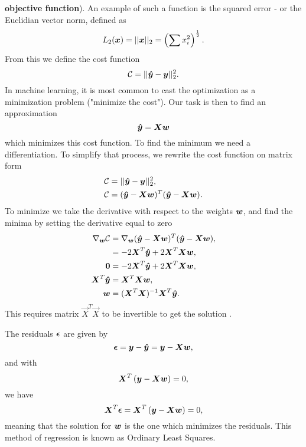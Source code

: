 \textbf{objective function}). An example of such a function is the squared error - or the Euclidian vector norm, defined as
\begin{equation}
	L_2({\boldsymbol{x}}) =||{\boldsymbol{x}}||_2 = \left(\sum x_i^2\right)^{\frac{1}{2}}.
\end{equation}
From this we define the cost function
\begin{equation}
	\mathcal{C} = || {\boldsymbol{\hat{y}}} - {\boldsymbol{y}} ||_2 ^2. \label{eq:cost-mse}
\end{equation}
In machine learning, it is most common to cast the optimization as a minimization problem
("minimize the cost"). Our task is then to find an approximation
\begin{equation}\label{eq:ols-approximation}
	{\boldsymbol{\hat{y}}} = {\boldsymbol{Xw}}
\end{equation}
which minimizes this cost function.
To find the minimum we need a differentiation. To simplify that process, we rewrite the cost function on matrix form
\begin{align*}
\mathcal{C} &= || {\boldsymbol{\hat{y}}} - {\boldsymbol{y}} ||_2 ^2, \\
\mathcal{C} &= ( {\boldsymbol{\hat{y}}} - {\boldsymbol{Xw}})^T( {\boldsymbol{\hat{y}}} - {\boldsymbol{Xw}}).
\end{align*}
To minimize we take the derivative with respect to the weights ${\boldsymbol{w}}$,
and find the minima by setting the derivative equal to zero
\begin{align}
\nabla _{{\boldsymbol{w}}}\mathcal{C} &= \nabla _{{\boldsymbol{w}}} ( {\boldsymbol{\hat{y}}} - {\boldsymbol{Xw}})^T( {\boldsymbol{\hat{y}}} - {\boldsymbol{Xw}}), \\
&= -2{\boldsymbol{X}}^T{\boldsymbol{\hat{y}}} + 2{\boldsymbol{X}}^T{\boldsymbol{X}}{\boldsymbol{w}}, \\
{\boldsymbol{0}} &= -2{\boldsymbol{X}}^T{\boldsymbol{\hat{y}}} + 2{\boldsymbol{X}}^T{\boldsymbol{X}}{\boldsymbol{w}}, \\
{\boldsymbol{X}}^T{\boldsymbol{\hat{y}}} &= {\boldsymbol{X}}^T{\boldsymbol{X}}{\boldsymbol{w}}, \\
{\boldsymbol{w}} &=({\boldsymbol{X}}^T{\boldsymbol{X}})^{-1} {\boldsymbol{X}}^T{\boldsymbol{\hat{y}}}. \label{eq:ols}
\end{align}
This requires matrix \(\vec{X}^T\vec{X}\) to be invertible to get the solution 
\cite{James2000}.

The residuals ${\boldsymbol{\epsilon}}$ are given by
$${\boldsymbol{\epsilon}} = {\boldsymbol{y}}-{\boldsymbol{\hat{y}}} = {\boldsymbol{y}}-{\boldsymbol{X}}{\boldsymbol{w}},$$
and with 
$${\boldsymbol{X}}^T\left( {\boldsymbol{y}}-{\boldsymbol{X}}{\boldsymbol{w}}\right)= 0,$$
we have
$${\boldsymbol{X}}^T{\boldsymbol{\epsilon}}={\boldsymbol{X}}^T\left( {\boldsymbol{y}}-{\boldsymbol{X}}{\boldsymbol{w}}\right)= 0,$$
meaning that the solution for ${\boldsymbol{w}}$ is the one which minimizes the residuals.
This method of regression is known as Ordinary Least Squares.


